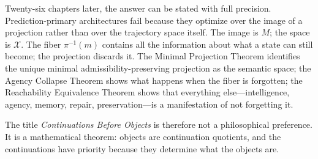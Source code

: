 \documentclass[12pt, oneside]{book}
\theoremstyle{flyxion}
\theoremstyle{definition}
\begin{document}
Twenty-six chapters later, the answer can be stated
with full precision. Prediction-primary architectures
fail because they optimize over the image of a
projection rather than over the trajectory space
itself. The image is $M$; the space is $\mathcal{X}$.
The fiber $\pi^{-1}(m)$ contains all the information
about what a state can still become; the projection
discards it. The Minimal Projection Theorem identifies
the unique minimal admissibility-preserving projection
as the semantic space; the Agency Collapse Theorem
shows what happens when the fiber is forgotten; the
Reachability Equivalence Theorem shows that
everything else---intelligence, agency, memory, repair,
preservation---is a manifestation of not forgetting it.

The title \emph{Continuations Before Objects} is
therefore not a philosophical preference. It is a
mathematical theorem: objects are continuation
quotients, and the continuations have priority because
they determine what the objects are.
\end{document}
